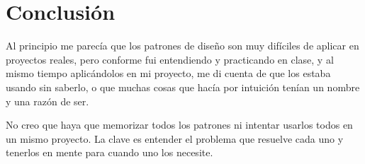 \documentclass{article}
\begin{document}
\section{Conclusi\'on}
 
Al principio me parec\'ia que los patrones de dise\~no son muy dif\'iciles de
aplicar en proyectos reales, pero conforme fui entendiendo y practicando en
clase, y al mismo tiempo aplic\'andolos en mi proyecto, me di cuenta de que los
estaba usando sin saberlo, o que muchas cosas que hac\'ia por intuici\'on ten\'ian
un nombre y una raz\'on de ser.
 
No creo que haya que memorizar todos los patrones ni intentar usarlos todos
en un mismo proyecto. La clave es entender el problema que resuelve cada uno
y tenerlos en mente para cuando uno los necesite.
 
\end{document}
